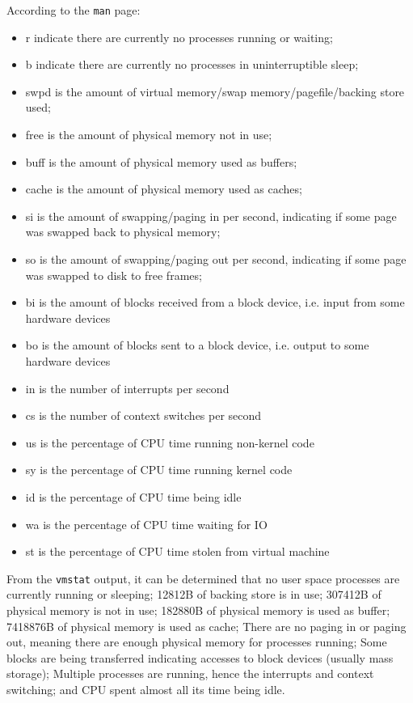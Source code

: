 \documentclass{article}
\begin{document}
According to the \texttt{man} page:
\begin{itemize}
  \item r indicate there are currently no processes running or waiting;
  \item b indicate there are currently no processes in uninterruptible sleep;
  \item swpd is the amount of virtual memory/swap memory/pagefile/backing store used;
  \item free is the amount of physical memory not in use;
  \item buff is the amount of physical memory used as buffers;
  \item cache is the amount of physical memory used as caches;
  \item si is the amount of swapping/paging in per second, indicating if some page was swapped back to physical memory;
  \item so is the amount of swapping/paging out per second, indicating if some page was swapped to disk to free frames;
  \item bi is the amount of blocks received from a block device, i.e. input from some hardware devices
  \item bo is the amount of blocks sent to a block device, i.e. output to some hardware devices
  \item in is the number of interrupts per second
  \item cs is the number of context switches per second
  \item us is the percentage of CPU time running non-kernel code
  \item sy is the percentage of CPU time running kernel code
  \item id is the percentage of CPU time being idle
  \item wa is the percentage of CPU time waiting for IO
  \item st is the percentage of CPU time stolen from virtual machine
\end{itemize}

From the \texttt{vmstat} output, it can be determined that no user space processes are currently running or sleeping; 
12812B of backing store is in use; 307412B of physical memory is not in use; 182880B of physical memory is used as buffer; 
7418876B of physical memory is used as cache; There are no paging in or paging out, meaning there are enough physical memory for processes running;
Some blocks are being transferred indicating accesses to block devices (usually mass storage); Multiple processes are running, hence the interrupts and context switching; 
and CPU spent almost all its time being idle. 
\end{document}
